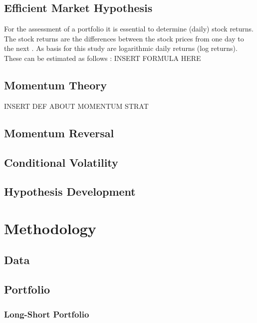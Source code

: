 \documentclass[12pt]{article}
\begin{document}
\subsection{Efficient Market Hypothesis} \label{subsection:EMH}
For the assessment of a portfolio it is essential to determine (daily) stock returns. The stock returns are the differences between the stock prices from one day to the next \parencite{Tsay2002}. As basis for this study are logarithmic daily returns (log returns). These can be estimated as follows \parencite{Tsay2002}: 
INSERT FORMULA HERE

\subsection{Momentum Theory} \label{subsection:Momentum_theory}
INSERT DEF ABOUT MOMENTUM STRAT

\subsection{Momentum Reversal} \label{subsection:Momentum_reversal}

\subsection{Conditional Volatility} \label{subsection:condvol}


\subsection{Hypothesis Development} \label{subsection:Hypotheses}


\section{Methodology} \label{section:Method}

\subsection{Data} \label{subsection:Data}

\subsection{Portfolio} \label{subsection:Portfolio}

\subsubsection{Long-Short Portfolio} \label{subsubsection:LS_portfolio}
\end{document}
